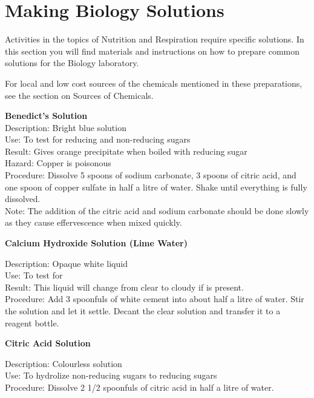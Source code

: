 \chapter{Making Biology Solutions}
Activities in the topics of Nutrition and Respiration require specific solutions. In this section you will find materials and instructions on how to prepare common solutions for the Biology laboratory.

For local and low cost sources of the chemicals mentioned in these preparations, see the section on Sources of Chemicals.

\begin{flushleft}
\textbf{Benedict's Solution}\\
Description: Bright blue solution\\
Use: To test for reducing and non-reducing sugars\\
Result: Gives orange precipitate when boiled with reducing sugar\\
Hazard: Copper is poisonous\\
Procedure: Dissolve 5 spoons of sodium carbonate, 3 spoons of citric acid,
and one spoon of copper sulfate in half a litre of water. Shake until everything is fully dissolved.\\Note: The addition of the citric acid and sodium carbonate should be done slowly as they cause effervescence when mixed quickly.
\end{flushleft}

\begin{flushleft}
\textbf{Calcium Hydroxide Solution (Lime Water)}
\end{flushleft}
\vspace{-10pt}
Description: Opaque white liquid\\
Use: To test for \\
Result: This liquid will change from clear to cloudy if  is present.\\
Procedure: Add 3 spoonfuls of white cement into about half a litre of water. Stir the solution and let it settle. Decant the clear solution and transfer it to a reagent bottle.\\

\begin{flushleft}
\textbf{Citric Acid Solution}
\end{flushleft}
\vspace{-10pt}
Description: Colourless solution\\
Use: To hydrolize non-reducing sugars to reducing sugars\\
Procedure: Dissolve 2 1/2 spoonfuls of citric acid in half a litre of water.\\


